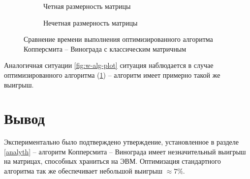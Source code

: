 \begin{figure}[H]
	\captionsetup{singlelinecheck = false, justification=centering}
	\centering
	\begin{subfigure}[b]{\textwidth}
		\centering
		\caption{Четная размерность матрицы}
	\end{subfigure}
	\hfill
	\begin{subfigure}[b]{\textwidth}
		\centering
		\caption{Нечетная размерность матрицы}
	\end{subfigure}
	\hfill
	\caption{Сравнение времени выполнения оптимизированного алгоритма Копперсмита -- Винограда с классическим матричным}
	\label{fig:o-w-alg-plot}
\end{figure}
Аналогичная ситуации \ref{fig:w-alg-plot} ситуация наблюдается в случае оптимизированного алгоритма (\ref{fig:o-w-alg-plot}) -- алгоритм имеет примерно такой же выигрыш. 
\section{Вывод}
Экспериментально было подтверждено утверждение, установленное в разделе \ref{analyth} -- алгоритм Копперсмита -- Винограда имеет незначительный  выигрыш на матрицах, способных храниться на ЭВМ. Оптимизация стандартного алгоритма так же обеспечивает небольшой выигрыш $\approx 7\%$.	
